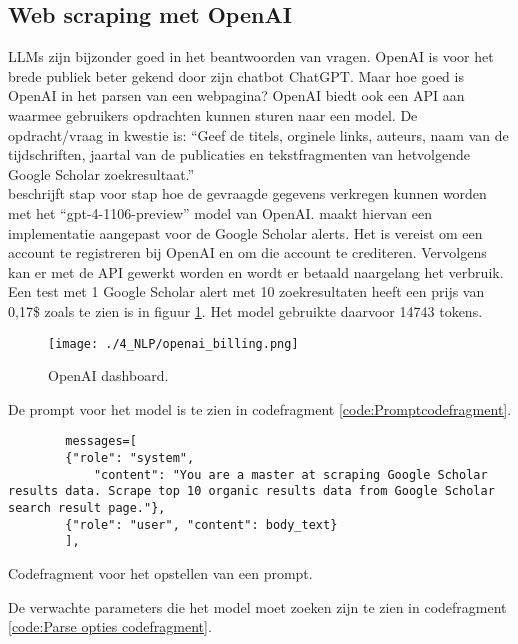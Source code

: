 \subsection{Web scraping met OpenAI}
LLMs zijn bijzonder goed in het beantwoorden van vragen. OpenAI is voor het brede publiek beter gekend door zijn chatbot ChatGPT. Maar hoe goed is OpenAI in het parsen van een webpagina? OpenAI biedt ook een API aan waarmee gebruikers opdrachten kunnen sturen naar een model. De opdracht/vraag in kwestie is: ``Geef de titels, orginele links, auteurs, naam van de tijdschriften, jaartal van de publicaties en tekstfragmenten van hetvolgende Google Scholar zoekresultaat.''\\
\textcite{Serpapiai2025} beschrijft stap voor stap hoe de gevraagde gegevens verkregen kunnen worden met het ``gpt-4-1106-preview'' model van OpenAI.
\textcite{Depaepeopenai2025} maakt hiervan een implementatie aangepast voor de Google Scholar alerts.
Het is vereist om een account te registreren bij OpenAI en om die account te crediteren. Vervolgens kan er met de API gewerkt worden en wordt er betaald naargelang het verbruik.
Een test met 1 Google Scholar alert met 10 zoekresultaten heeft een prijs van 0,17\$ zoals te zien is in figuur \ref{fig:OpenAI dashboard}. Het model gebruikte daarvoor 14743 tokens. 
\begin{figure}
    \centering
    \texttt{[image: ./4\_NLP/openai\_billing.png]}
    \caption[OpenAI dashboard.]{\label{fig:OpenAI dashboard}OpenAI dashboard.}
\end{figure}
De prompt voor het model is te zien in codefragment \ref{code:Promptcodefragment}.
\begin{listing}
    \begin{verbatim}
        messages=[
        {"role": "system",
            "content": "You are a master at scraping Google Scholar results data. Scrape top 10 organic results data from Google Scholar search result page."},
        {"role": "user", "content": body_text}
        ],
    \end{verbatim}
    \caption[Prompt codefragment]{Codefragment voor het opstellen van een prompt.}
    \label{code:Promptcodefragment}
\end{listing}
De verwachte parameters die het model moet zoeken zijn te zien in codefragment \ref{code:Parse opties codefragment}.
